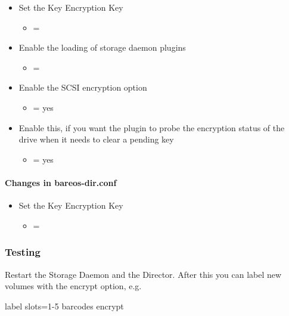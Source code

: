 \begin{itemize}
 \item Set the Key Encryption Key
   \begin{itemize}
   \item {} = 
   \end{itemize}
 \item Enable the loading of storage daemon plugins
   \begin{itemize}
   \item {} = 
   \end{itemize}
 \item Enable the SCSI encryption option
   \begin{itemize}
   \item {} = yes
   \end{itemize}
 \item Enable this, if you want the plugin to probe the encryption status of the drive when it needs to clear a pending key
   \begin{itemize}
   \item {} = yes
   \end{itemize}
\end{itemize}

\paragraph{Changes in bareos-dir.conf}

\begin{itemize}
 \item Set the Key Encryption Key
   \begin{itemize}
   \item {} = 
   \end{itemize}
\end{itemize}

\subsubsection{Testing}

Restart the Storage Daemon and the Director.
After this you can label new volumes with the encrypt option, e.g.
\begin{bconfig}{}
label slots=1-5 barcodes encrypt
\end{bconfig}


